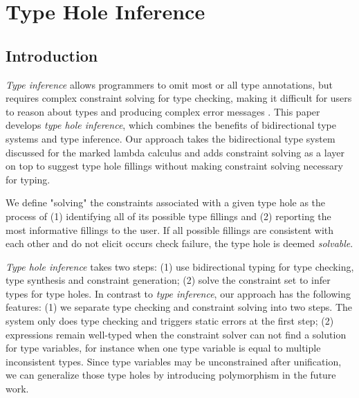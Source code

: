 



\section{Type Hole Inference}
\subsection{Introduction}
\label{sec:intro}
\emph{Type inference} allows programmers to omit most or all type annotations, but requires complex constraint solving for type checking, making it difficult for users to reason about types and producing complex error messages \cite{typeinferDif}. This paper develops \emph{type hole inference}, which combines the benefits of bidirectional type systems and type inference. Our approach takes the bidirectional type system discussed for the marked lambda calculus and adds constraint solving as a layer on top to suggest type hole fillings without making constraint solving necessary for typing. 

We define "solving" the constraints associated with a given type hole as the process of (1) identifying all of its possible type fillings and (2) reporting the most informative fillings to the user. If all possible fillings are consistent with each other and do not elicit occurs check failure, the type hole is deemed \emph{solvable}.

\emph{Type hole inference} takes two steps: (1) use bidirectional typing for type checking, type synthesis and constraint generation; (2) solve the constraint set to infer types for type holes. In contrast to \emph{type inference}, our approach has the following features: (1) we separate type checking and constraint solving into two steps. The system only does type checking and triggers static errors at the first step; (2) expressions remain well-typed when the constraint solver can not find a solution for type variables, for instance when one type variable is equal to multiple inconsistent types. Since  type variables may be unconstrained after unification, we can generalize those type holes by introducing polymorphism in the future work. 

